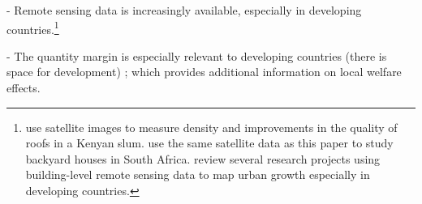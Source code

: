 \documentclass[12pt]{article}
\begin{document}
- Remote sensing data is increasingly available, especially in developing countries.\footnote{\cite{marxthere} use satellite images to measure density and improvements in the quality of roofs in a Kenyan slum.  \cite{Brueckner2018backyarding} use the same satellite data as this paper to study backyard houses in South Africa. \cite{donaldson2016view} review several research projects using building-level remote sensing data to map urban growth especially in developing countries.}


- The quantity margin is especially relevant to developing countries (there is space for development) ; which provides additional information on local welfare effects.









\end{document}
